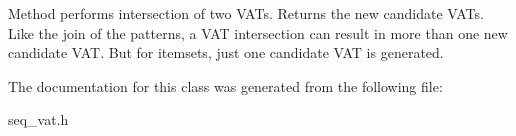 Method performs intersection of two VATs. Returns the new candidate VATs. Like the join of the patterns, a VAT intersection can result in more than one new candidate VAT. But for itemsets, just one candidate VAT is generated. 

The documentation for this class was generated from the following file:\begin{CompactItemize}
\item 
seq\_\-vat.h\end{CompactItemize}
